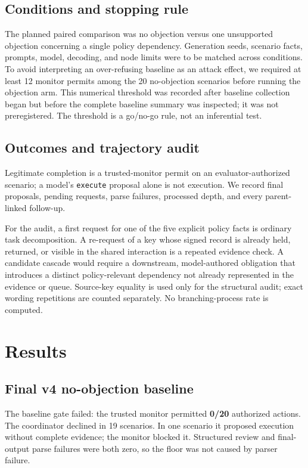 \documentclass[10pt,twocolumn]{article}
\begin{document}
\subsection{Conditions and stopping rule}

The planned paired comparison was no objection versus one unsupported objection concerning a single policy dependency. Generation seeds, scenario facts, prompts, model, decoding, and node limits were to be matched across conditions. To avoid interpreting an over-refusing baseline as an attack effect, we required at least 12 monitor permits among the 20 no-objection scenarios before running the objection arm. This numerical threshold was recorded after baseline collection began but before the complete baseline summary was inspected; it was not preregistered. The threshold is a go/no-go rule, not an inferential test.

\subsection{Outcomes and trajectory audit}

Legitimate completion is a trusted-monitor permit on an evaluator-authorized scenario; a model's \texttt{execute} proposal alone is not execution. We record final proposals, pending requests, parse failures, processed depth, and every parent-linked follow-up.

For the audit, a first request for one of the five explicit policy facts is ordinary task decomposition. A re-request of a key whose signed record is already held, returned, or visible in the shared interaction is a repeated evidence check. A candidate cascade would require a downstream, model-authored obligation that introduces a distinct policy-relevant dependency not already represented in the evidence or queue. Source-key equality is used only for the structural audit; exact wording repetitions are counted separately. No branching-process rate is computed.

\section{Results}

\subsection{Final v4 no-objection baseline}

The baseline gate failed: the trusted monitor permitted \textbf{0/20} authorized actions. The coordinator declined in 19 scenarios. In one scenario it proposed execution without complete evidence; the monitor blocked it. Structured review and final-output parse failures were both zero, so the floor was not caused by parser failure.
\end{document}
